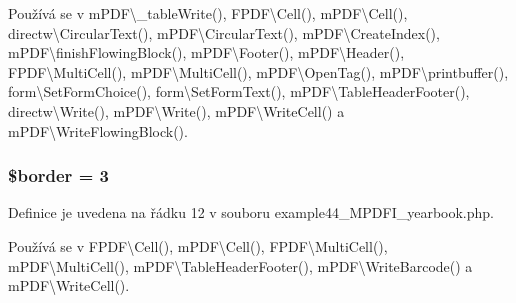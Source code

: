 Používá se v m\-P\-D\-F\textbackslash{}\-\_\-table\-Write(), F\-P\-D\-F\textbackslash{}\-Cell(), m\-P\-D\-F\textbackslash{}\-Cell(), directw\textbackslash{}\-Circular\-Text(), m\-P\-D\-F\textbackslash{}\-Circular\-Text(), m\-P\-D\-F\textbackslash{}\-Create\-Index(), m\-P\-D\-F\textbackslash{}finish\-Flowing\-Block(), m\-P\-D\-F\textbackslash{}\-Footer(), m\-P\-D\-F\textbackslash{}\-Header(), F\-P\-D\-F\textbackslash{}\-Multi\-Cell(), m\-P\-D\-F\textbackslash{}\-Multi\-Cell(), m\-P\-D\-F\textbackslash{}\-Open\-Tag(), m\-P\-D\-F\textbackslash{}printbuffer(), form\textbackslash{}\-Set\-Form\-Choice(), form\textbackslash{}\-Set\-Form\-Text(), m\-P\-D\-F\textbackslash{}\-Table\-Header\-Footer(), directw\textbackslash{}\-Write(), m\-P\-D\-F\textbackslash{}\-Write(), m\-P\-D\-F\textbackslash{}\-Write\-Cell() a m\-P\-D\-F\textbackslash{}\-Write\-Flowing\-Block().

\hypertarget{example44___m_p_d_f_i__yearbook_8php_abb3c880c6024841924696a2da6c4eb3a}{
\subsubsection[{\$border}]{\setlength{\rightskip}{0pt plus 5cm}\$border = 3}}\label{example44___m_p_d_f_i__yearbook_8php_abb3c880c6024841924696a2da6c4eb3a}


Definice je uvedena na řádku 12 v souboru example44\-\_\-\-M\-P\-D\-F\-I\-\_\-yearbook.\-php.



Používá se v F\-P\-D\-F\textbackslash{}\-Cell(), m\-P\-D\-F\textbackslash{}\-Cell(), F\-P\-D\-F\textbackslash{}\-Multi\-Cell(), m\-P\-D\-F\textbackslash{}\-Multi\-Cell(), m\-P\-D\-F\textbackslash{}\-Table\-Header\-Footer(), m\-P\-D\-F\textbackslash{}\-Write\-Barcode() a m\-P\-D\-F\textbackslash{}\-Write\-Cell().

